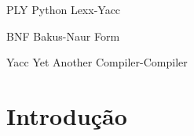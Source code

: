 \documentclass[
	12pt,				%
	openright,			%
	twoside,			%
	a4paper,			%
	english,			%
	french,				%
	spanish,			%
	brazil				%
	]{abntex2}
\begin{document}
\frenchspacing 


\imprimircapa

\imprimirfolhaderosto*


%
%     

\begin{siglas}
  \item[PLY] Python Lexx-Yacc
  \item[BNF] Bakus-Naur Form
  \item[Yacc] Yet Another Compiler-Compiler
\end{siglas}

\tableofcontents*
\cleardoublepage



\textual

\chapter*[Introdução]{Introdução}
\end{document}
